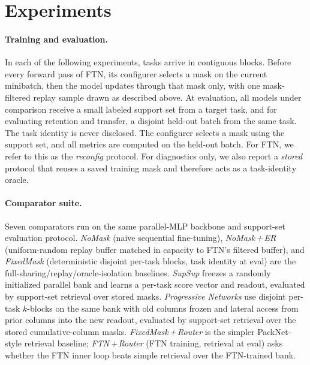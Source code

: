 \documentclass{article}
\begin{document}
\section{Experiments}\label{sec:experiments}

\paragraph{Training and evaluation.}
In each of the following experiments, tasks arrive in contiguous blocks. Before every forward pass of FTN, its configurer selects a mask on the current minibatch, then the model updates through that mask only, with one mask-filtered replay sample drawn as described above. At evaluation, all models under comparison receive a small labeled support set from a target task, and for evaluating retention and transfer, a disjoint held-out batch from the same task. The task identity is never disclosed. The configurer selects a mask using the support set, and all metrics are computed on the held-out batch. For FTN, we refer to this as the \emph{reconfig} protocol. For diagnostics only, we also report a \emph{stored} protocol that reuses a saved training mask and therefore acts as a task-identity oracle.

\paragraph{Comparator suite.}
Seven comparators run on the same parallel-MLP backbone and support-set evaluation protocol. \emph{NoMask} (naive sequential fine-tuning), \emph{NoMask\,+\,ER} (uniform-random replay buffer matched in capacity to FTN's filtered buffer), and \emph{FixedMask} (deterministic disjoint per-task blocks, task identity at eval) are the full-sharing/replay/oracle-isolation baselines. \emph{SupSup} \citep{wortsman2020supermasks} freezes a randomly initialized parallel bank and learns a per-task score vector and readout, evaluated by support-set retrieval over stored masks. \emph{Progressive Networks} \citep{rusu2016progressive} use disjoint per-task $k$-blocks on the same bank with old columns frozen and lateral access from prior columns into the new readout, evaluated by support-set retrieval over the stored cumulative-column masks. \emph{FixedMask\,+\,Router} is the simpler PackNet-style retrieval baseline; \emph{FTN\,+\,Router} (FTN training, retrieval at eval) asks whether the FTN inner loop beats simple retrieval over the FTN-trained bank. 
\end{document}
